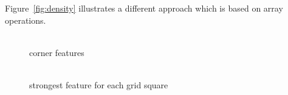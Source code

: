 \documentclass[12pt,a4paper,oneside,openright]{book}
\newcommand{\fig}[1]{Figure~\ref{fig:#1}}
\begin{document}
\begin{CJK}{UTF8}{}
\fig{density} illustrates a different approach which is based on array operations.
\begin{figure}[htbp]
  \begin{center}
    \begin{minipage}[t]{.32\textwidth}
      \begin{center}
        \\
        corner features
      \end{center}
    \end{minipage}
    \begin{minipage}[t]{.32\textwidth}
      \begin{center}
        \\
        strongest feature for each grid square
      \end{center}
    \end{minipage}
    \begin{minipage}[t]{.32\textwidth}
      \begin{center}
        \\

\end{center}
\end{minipage}
\end{center}
\end{figure}
\end{CJK}
\end{document}
